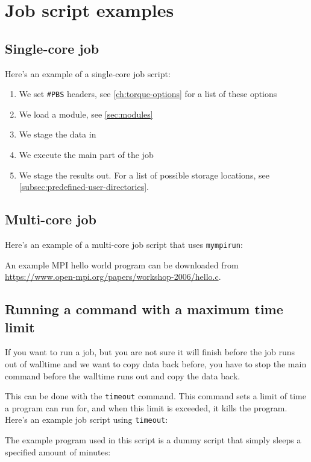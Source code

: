 \chapter{Job script examples}
\label{ch:jobscript-examples}

\section{Single-core job}

Here's an example of a single-core job script:


\begin{enumerate}
    \item We set \lstinline|#PBS| headers, see \autoref{ch:torque-options} for a list of these options
    \item We load a module, see \autoref{sec:modules}
    \item We stage the data in
    \item We execute the main part of the job
    \item We stage the results out. For a list of possible storage locations, see \autoref{subsec:predefined-user-directories}.
\end{enumerate}

\section{Multi-core job}

Here's an example of a multi-core job script that uses \lstinline|mympirun|:


An example MPI hello world program can be downloaded from \url{https://www.open-mpi.org/papers/workshop-2006/hello.c}.


\section{Running a command with a maximum time limit}
\label{sec:maximum-timelimit-timeout-jobscript}

If you want to run a job, but you are not sure it will finish before the job runs
out of walltime and we want to copy data back before, you have to stop the main
command before the walltime runs out and copy the data back.

This can be done with the \lstinline|timeout| command. This command sets a limit
of time a program can run for, and when this limit is exceeded, it kills the program.
Here's an example job script using \lstinline|timeout|:


The example program used in this script is a dummy script that simply sleeps a specified amount of minutes:

